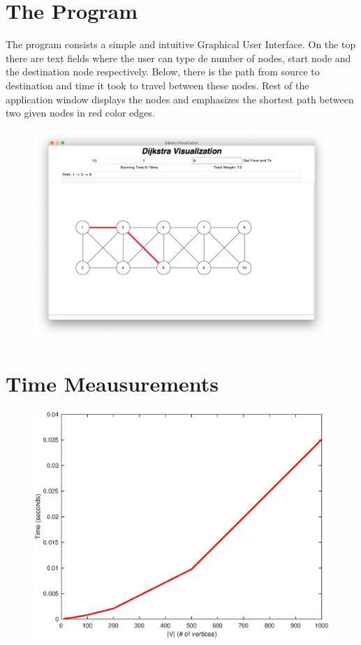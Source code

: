 \documentclass[twocolumns]{IEEEtran}
\begin{document}
	\section{The Program}

	The program consists a simple and intuitive Graphical User Interface. On the top there are text fields where the user can type de number of nodes, start node and the destination node respectively. Below, there is the path from source to destination and time it took to travel between these nodes. Rest of the application window displays the nodes and emphasizes the shortest path between two given nodes in red color edges.

	\begin{figure}[h]
		\centering
		\includegraphics[scale=.2]{main_window.png}
	\end{figure}
	
	\section{Time Meausurements}
	\begin{figure}[h]
		\centering
		\includegraphics[scale=.4]{matlab/time.eps}
	\end{figure}

	
	
\end{document}
